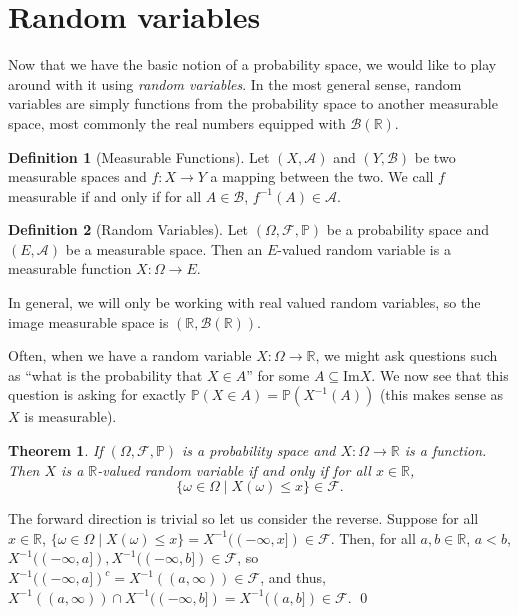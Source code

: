 \documentclass[
]{article}
\newtheorem{theorem}{Theorem}
\theoremstyle{definition}
\newtheorem{definition}{Definition}[section]
\begin{document}
\newpage

\hypertarget{random-variables}{%
\section{Random variables}\label{random-variables}}

Now that we have the basic notion of a probability space, we would like
to play around with it using \emph{random variables}. In the most
general sense, random variables are simply functions from the
probability space to another measurable space, most commonly the real
numbers equipped with \(\mathcal{B}(\mathbb{R})\).

\begin{definition}[Measurable Functions]
  Let \((X, \mathcal{A})\) and \((Y, \mathcal{B})\) be two measurable spaces and 
  \(f : X \to Y\) a mapping between the two. We call \(f\) measurable if and 
  only if for all \(A \in \mathcal{B}\), \(f^{-1}(A) \in \mathcal{A}\).
\end{definition}

\begin{definition}[Random Variables]
  Let \((\Omega, \mathcal{F}, \mathbb{P})\) be a probability space and 
  \((E, \mathcal{A})\) be a measurable space. Then an \(E\)-valued random variable 
  is a measurable function \(X : \Omega \to E\).
\end{definition}

In general, we will only be working with real valued random variables,
so the image measurable space is
\((\mathbb{R}, \mathcal{B}(\mathbb{R}))\).

Often, when we have a random variable \(X : \Omega \to \mathbb{R}\), we
might ask questions such as ``what is the probability that \(X \in A\)''
for some \(A \subseteq \text{Im} X\). We now see that this question is
asking for exactly \(\mathbb{P}(X \in A) = \mathbb{P}(X^{-1}(A))\) (this
makes sense as \(X\) is measurable).

\begin{theorem}
  If \((\Omega, \mathcal{F}, \mathbb{P})\) is a probability space and 
  \(X : \Omega \to \mathbb{R}\) is a function. Then \(X\) is a 
  \(\mathbb{R}\)-valued random variable if and only if for all 
  \(x \in \mathbb{R}\),
  \[\{\omega \in \Omega \mid X(\omega) \le x\} \in \mathcal{F}.\]
\end{theorem}
\proof

The forward direction is trivial so let us consider the reverse. Suppose
for all \(x \in \mathbb{R}\),
\(\{\omega \in \Omega \mid X(\omega) \le x\} = X^{-1}((-\infty, x]) \in \mathcal{F}\).
Then, for all \(a, b \in \mathbb{R}\), \(a < b\),
\(X^{-1}((-\infty, a]), X^{-1}((-\infty, b]) \in \mathcal{F}\), so
\(X^{-1}((-\infty, a])^c = X^{-1}((a, \infty)) \in \mathcal{F}\), and
thus,
\(X^{-1}((a, \infty)) \cap X^{-1}((-\infty, b]) = X^{-1}((a, b]) \in \mathcal{F}\).
\qed
\end{document}
